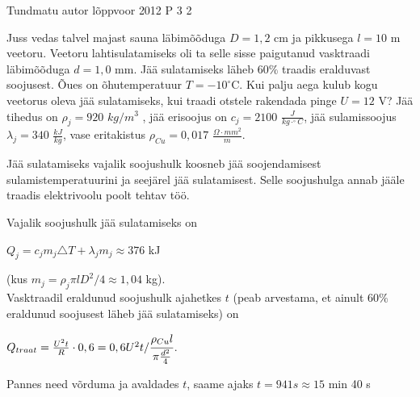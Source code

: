 {Tundmatu autor} %
{lõppvoor} %
{2012} %
{P 3} %
{2} %
{

\ifStatement
Juss vedas talvel majast sauna läbimõõduga $D = 1,2$ cm ja pikkusega $l = 10$ m veetoru. Veetoru lahtisulatamiseks oli ta selle sisse paigutanud vasktraadi läbimõõduga $d = 1,0$ mm. Jää sulatamiseks läheb $60\%$ traadis eralduvast soojusest. Õues on õhutemperatuur $T = -10^{\circ}$C. Kui palju aega kulub kogu veetorus oleva jää sulatamiseks, kui traadi otstele rakendada pinge $U = 12$ V? Jää tihedus on $\rho_j = 920 $ $kg/m^3$ , jää erisoojus on $c_j = 2100$ $\frac{J}{kg \cdot ^{\circ} C}$, jää sulamissoojus $\lambda_j = 340$ $\frac{kJ}{kg}$, vase eritakistus $\rho_{Cu} = 0,017$ $\frac{\Omega \cdot mm^2}{m}$.
\fi

\ifHint
Jää sulatamiseks vajalik soojushulk koosneb jää soojendamisest sulamistemperatuurini ja seejärel jää sulatamisest. Selle soojushulga annab jääle traadis elektrivoolu poolt tehtav töö.
\fi

\ifSolution
Vajalik soojushulk jää sulatamiseks on
\begin{center}
$Q_j = c_j m_j \triangle T + \lambda _j m_j \approx 376$ kJ
\end{center}
(kus  $m_j = \rho_j \pi l D^2 / 4 \approx 1,04$ kg). \\
Vasktraadil eraldunud soojushulk ajahetkes $t$ (peab arvestama, et ainult $60\%$ eraldunud soojusest läheb jää sulatamiseks) on 
\begin{center}
$Q_{traat} = \frac{U^2 t}{R} \cdot 0,6 = 0,6 U^2t / \cfrac{\rho_{Cu} l}{\pi \frac{d^2}{4}}$.
\end{center}
Pannes need võrduma ja avaldades $t$, saame ajaks $t = 941 s \approx 15$ min 40 s
\fi
}